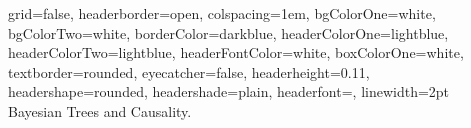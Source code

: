 \documentclass[a0paper,portrait]{baposter}
\begin{document}


\newenvironment{myindentpar}[1]%
  {\begin{list}{}%
          {\setlength{\leftmargin}{#1}}%
          \item[]%
  }
  {\end{list}}



\begin{poster}
{
grid=false,
headerborder=open, %
colspacing=1em, %
bgColorOne=white, %
bgColorTwo=white, %
borderColor=darkblue, %
headerColorOne=lightblue, %
headerColorTwo=lightblue, %
headerFontColor=white, %
boxColorOne=white, %
textborder=rounded, %
eyecatcher=false, %
headerheight=0.11\textheight, %
headershape=rounded, %
headershade=plain,
headerfont=\Large\textsf, %
linewidth=2pt %
}
{}
%
%
{
\textsf %
{
\vspace{1em}\\
Bayesian Trees and Causality. \\
\vspace{0.1mm}\\
}}
\end{poster}
\end{document}
